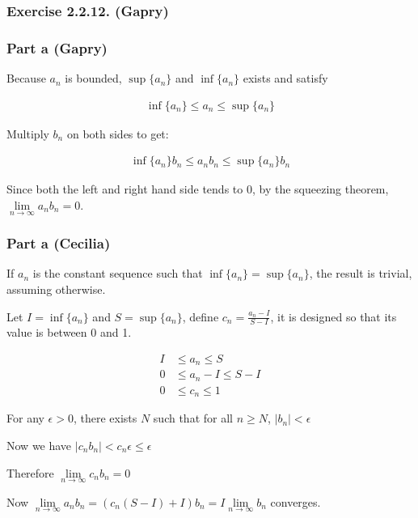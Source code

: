 \subsubsection*{Exercise 2.2.12. (Gapry)}

\subsubsection*{Part a (Gapry)}
Because $ a_n $ is bounded, $ \sup\{a_n\} $ and $ \inf \{a_n\} $ exists and satisfy

\begin{align*}
  \inf \{a_n\} \le a_n \le \sup \{a_n\} 
\end{align*}

Multiply $ b_n $ on both sides to get: 

\begin{align*}
  \inf \{a_n\}b_n \le a_n b_n \le \sup \{a_n\} b_n
\end{align*}

Since both the left and right hand side tends to 0, by the squeezing theorem, $ \lim\limits_{n \to \infty} a_n b_n = 0 $.

\subsubsection*{Part a (Cecilia)}
If $ a_n $ is the constant sequence such that $ \inf\{a_n\} = \sup\{a_n\} $, the result is trivial, assuming otherwise.

Let $ I = \inf\{a_n\} $ and $ S = \sup\{a_n\} $, define $ c_n = \frac{a_n - I}{S - I} $, it is designed so that its value is between 0 and 1.

\begin{align*}
  I &\le a_n     \le S     \\
  0 &\le a_n - I \le S - I \\
  0 &\le c_n     \le 1
\end{align*}

For any $ \epsilon > 0 $, there exists $ N $ such that for all $ n \ge N $, $ \left|b_n\right| < \epsilon $

Now we have $ \left|c_nb_n\right| < c_n\epsilon \le \epsilon $

Therefore $ \lim\limits_{n \to \infty} c_n b_n = 0 $

Now $ \lim\limits_{n \to \infty} a_n b_n = (c_n(S - I) + I) b_n = I \lim\limits_{n \to \infty} b_n$ converges.


